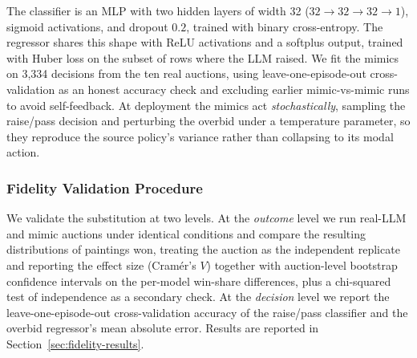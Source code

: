 \documentclass[conference]{IEEEtran}
\begin{document}
The classifier is an MLP with two hidden layers of width 32 ($32\!\to\!32\!\to\!32\!\to\!1$), sigmoid activations, and dropout $0.2$, trained with binary cross-entropy. The regressor shares this shape with ReLU activations and a softplus output, trained with Huber loss on the subset of rows where the LLM raised. We fit the mimics on 3{,}334 decisions from the ten real auctions, using leave-one-episode-out cross-validation as an honest accuracy check and excluding earlier mimic-vs-mimic runs to avoid self-feedback. At deployment the mimics act \emph{stochastically}, sampling the raise/pass decision and perturbing the overbid under a temperature parameter, so they reproduce the source policy's variance rather than collapsing to its modal action.

\subsubsection{Fidelity Validation Procedure}
We validate the substitution at two levels. At the \emph{outcome} level we run real-LLM and mimic auctions under identical conditions and compare the resulting distributions of paintings won, treating the auction as the independent replicate and reporting the effect size (Cram\'er's $V$) together with auction-level bootstrap confidence intervals on the per-model win-share differences, plus a chi-squared test of independence as a secondary check. At the \emph{decision} level we report the leave-one-episode-out cross-validation accuracy of the raise/pass classifier and the overbid regressor's mean absolute error. Results are reported in Section~\ref{sec:fidelity-results}.
\end{document}
